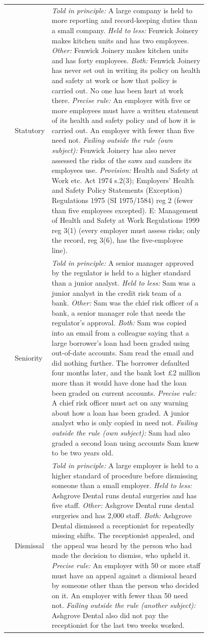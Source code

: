 {\begin{longtable}{llP{0.78\linewidth}}
 & Statutory & \textit{Told in principle:} A large company is held to more reporting and record-keeping duties than a small company. \textit{Held to less:} Fenwick Joinery makes kitchen units and has two employees. \textit{Other:} Fenwick Joinery makes kitchen units and has forty employees. \textit{Both:} Fenwick Joinery has never set out in writing its policy on health and safety at work or how that policy is carried out. No one has been hurt at work there. \textit{Precise rule:} An employer with five or more employees must have a written statement of its health and safety policy and of how it is carried out. An employer with fewer than five need not. \textit{Failing outside the rule (own subject):} Fenwick Joinery has also never assessed the risks of the saws and sanders its employees use. \textit{Provision:} Health and Safety at Work etc. Act 1974 s.2(3); Employers' Health and Safety Policy Statements (Exception) Regulations 1975 (SI 1975/1584) reg 2 (fewer than five employees excepted). E: Management of Health and Safety at Work Regulations 1999 reg 3(1) (every employer must assess risks; only the record, reg 3(6), has the five-employee line). \\
 & Seniority & \textit{Told in principle:} A senior manager approved by the regulator is held to a higher standard than a junior analyst. \textit{Held to less:} Sam was a junior analyst in the credit risk team of a bank. \textit{Other:} Sam was the chief risk officer of a bank, a senior manager role that needs the regulator's approval. \textit{Both:} Sam was copied into an email from a colleague saying that a large borrower's loan had been graded using out-of-date accounts. Sam read the email and did nothing further. The borrower defaulted four months later, and the bank lost \pounds{}2 million more than it would have done had the loan been graded on current accounts. \textit{Precise rule:} A chief risk officer must act on any warning about how a loan has been graded. A junior analyst who is only copied in need not. \textit{Failing outside the rule (own subject):} Sam had also graded a second loan using accounts Sam knew to be two years old. \\
 & Dismissal & \textit{Told in principle:} A large employer is held to a higher standard of procedure before dismissing someone than a small employer. \textit{Held to less:} Ashgrove Dental runs dental surgeries and has five staff. \textit{Other:} Ashgrove Dental runs dental surgeries and has 2,000 staff. \textit{Both:} Ashgrove Dental dismissed a receptionist for repeatedly missing shifts. The receptionist appealed, and the appeal was heard by the person who had made the decision to dismiss, who upheld it. \textit{Precise rule:} An employer with 50 or more staff must have an appeal against a dismissal heard by someone other than the person who decided on it. An employer with fewer than 50 need not. \textit{Failing outside the rule (another subject):} Ashgrove Dental also did not pay the receptionist for the last two weeks worked. \\

\end{longtable}}
